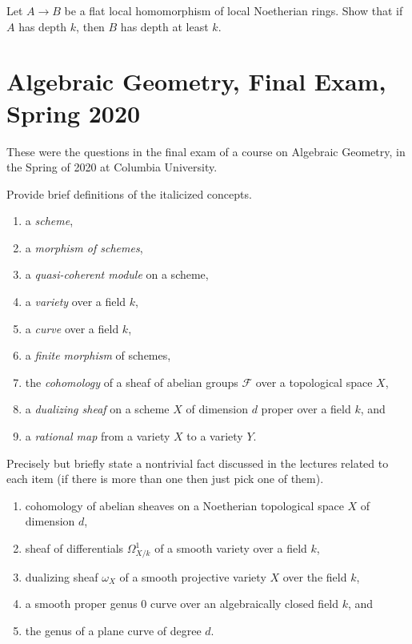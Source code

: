 \begin{exercise}
\label{exercise-depth-goes-up}
Let $A \to B$ be a flat local homomorphism of local Noetherian rings.
Show that if $A$ has depth $k$, then $B$ has depth at least $k$.
\end{exercise}









\section{Algebraic Geometry, Final Exam, Spring 2020}
\label{section-final-exam-spring-2020}

\noindent
These were the questions in the final exam of a course on Algebraic Geometry,
in the Spring of 2020 at Columbia University.

\begin{exercise}[Definitions]
\label{exercise-definitions-spring-2020}
Provide brief definitions of the italicized concepts.
\begin{enumerate}
\item a {\it scheme},
\item a {\it morphism of schemes},
\item a {\it quasi-coherent module} on a scheme,
\item a {\it variety} over a field $k$,
\item a {\it curve} over a field $k$,
\item a {\it finite morphism} of schemes,
\item the {\it cohomology} of a sheaf of abelian groups $\mathcal{F}$
over a topological space $X$,
\item a {\it dualizing sheaf} on a scheme $X$ of dimension $d$
proper over a field $k$, and
\item a {\it rational map} from a variety $X$ to a variety $Y$.
\end{enumerate}
\end{exercise}

\begin{exercise}[Theorems]
\label{exercise-results-spring-2020}
Precisely but briefly state a nontrivial fact discussed in the lectures
related to each item (if there is more than one then just pick
one of them).
\begin{enumerate}
\item cohomology of abelian sheaves on a Noetherian topological space
$X$ of dimension $d$,
\item sheaf of differentials $\Omega^1_{X/k}$ of a smooth variety
over a field $k$,
\item dualizing sheaf $\omega_X$ of a smooth projective variety $X$
over the field $k$,
\item a smooth proper
genus $0$ curve over an algebraically closed field $k$, and
\item the genus of a plane curve of degree $d$.
\end{enumerate}
\end{exercise}

